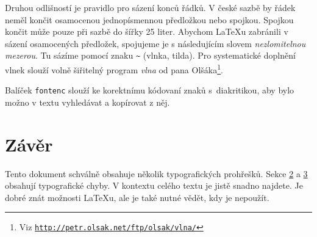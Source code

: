 \documentclass[twocolumn, 10pt, a4paper]{article}
\begin{document}
Druhou odlišností je pravidlo pro sázení konců řádků. V české sazbě by řádek neměl končit osamocenou jed\-no\-pís\-men\-nou předložkou nebo spojkou. Spojkou  končit může pouze při sazbě do šířky 25 liter. Abychom \LaTeX u zabránili v sázení osamocených předložek, spojujeme je s následujícím slovem \textit{nezlomitelnou mezerou}. Tu sázíme pomocí znaku \verb|~| (vlnka, tilda). Pro systematické doplnění vlnek slouží volně šiřitelný program \textit{vlna} od pana Olšáka\footnote{Viz \href{http://petr.olsak.net/ftp/olsak/vlna/}{\texttt{http://petr.olsak.net/ftp/olsak/vlna/}}}.

Balíček \texttt{fontenc} slouží ke korektnímu kódovaní znaků s~diakritikou, aby bylo možno v textu vyhledávat a ko\-pí\-ro\-vat z něj.

\section{Závěr}

Tento dokument schválně obsahuje několik typografických prohřešků. Sekce \hyperref[2]{2} a \hyperref[3]{3} obsahují typografické chyby. V kon\-tex\-tu celého textu je jistě snadno najdete. Je dobré znát možnosti \LaTeX u, ale je také nutné vědět, kdy je nepoužít.
\end{document}
